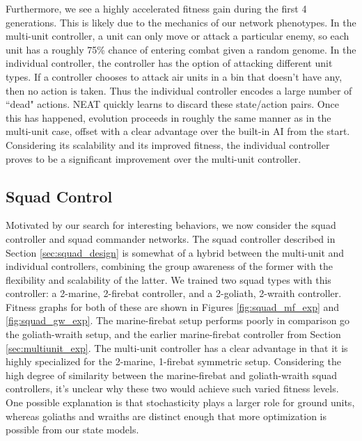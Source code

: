 \documentclass[10pt,a4paper,twocolumn]{article}
\begin{document}
Furthermore, we see a highly accelerated fitness gain during the first 4 generations. This is likely due to the mechanics of our network phenotypes. In the multi-unit controller, a unit can only move or attack a particular enemy, so each unit has a roughly 75\% chance of entering combat given a random genome. In the individual controller, the controller has the option of attacking different unit types. If a controller chooses to attack air units in a bin that doesn't have any, then no action is taken. Thus the individual controller encodes a large number of ``dead" actions. NEAT quickly learns to discard these state/action pairs. Once this has happened, evolution proceeds in roughly the same manner as in the multi-unit case, offset with a clear advantage over the built-in AI from the start. Considering its scalability and its improved fitness, the individual controller proves to be a significant improvement over the multi-unit controller.

\subsection{Squad Control}
\label{sec:squad_exp}

Motivated by our search for interesting behaviors, we now consider the squad controller and squad commander networks. The squad controller described in Section \ref{sec:squad_design} is somewhat of a hybrid between the multi-unit and individual controllers, combining the group awareness of the former with the flexibility and scalability of the latter. We trained two squad types with this controller: a 2-marine, 2-firebat controller, and a 2-goliath, 2-wraith controller. Fitness graphs for both of these are shown in Figures \ref{fig:squad_mf_exp} and \ref{fig:squad_gw_exp}. The marine-firebat setup performs poorly in comparison go the goliath-wraith setup, and the earlier marine-firebat controller from Section \ref{sec:multiunit_exp}. The multi-unit controller has a clear advantage in that it is highly specialized for the 2-marine, 1-firebat symmetric setup. Considering the high degree of similarity between the marine-firebat and goliath-wraith squad controllers, it's unclear why these two would achieve such varied fitness levels. One possible explanation is that stochasticity plays a larger role for ground units, whereas goliaths and wraiths are distinct enough that more optimization is possible from our state models.
\end{document}
